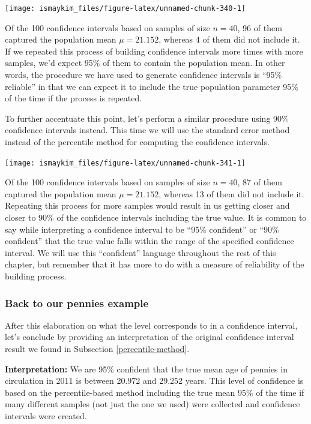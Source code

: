 \documentclass[12pt,]{krantz}
\theoremstyle{definition}
\theoremstyle{definition}
\theoremstyle{definition}
\theoremstyle{remark}
\begin{document}
\begin{center}\texttt{[image: ismaykim\_files/figure-latex/unnamed-chunk-340-1]} \end{center}

Of the 100 confidence intervals based on samples of size \(n = 40\), 96
of them captured the population mean \(\mu = 21.152\), whereas 4 of them
did not include it. If we repeated this process of building confidence
intervals more times with more samples, we'd expect 95\% of them to
contain the population mean. In other words, the procedure we have used
to generate confidence intervals is ``95\% reliable'' in that we can
expect it to include the true population parameter 95\% of the time if
the process is repeated.

To further accentuate this point, let's perform a similar procedure
using 90\% confidence intervals instead. This time we will use the
standard error method instead of the percentile method for computing the
confidence intervals.

\begin{center}\texttt{[image: ismaykim\_files/figure-latex/unnamed-chunk-341-1]} \end{center}

Of the 100 confidence intervals based on samples of size \(n = 40\), 87
of them captured the population mean \(\mu = 21.152\), whereas 13 of
them did not include it. Repeating this process for more samples would
result in us getting closer and closer to 90\% of the confidence
intervals including the true value. It is common to say while
interpreting a confidence interval to be ``95\% confident'' or ``90\%
confident'' that the true value falls within the range of the specified
confidence interval. We will use this ``confident'' language throughout
the rest of this chapter, but remember that it has more to do with a
measure of reliability of the building process.

\subsubsection*{Back to our pennies
example}\label{back-to-our-pennies-example}


After this elaboration on what the level corresponds to in a confidence
interval, let's conclude by providing an interpretation of the original
confidence interval result we found in Subsection
\ref{percentile-method}.

\textbf{Interpretation:} We are 95\% confident that the true mean age of
pennies in circulation in 2011 is between 20.972 and 29.252 years. This
level of confidence is based on the percentile-based method including
the true mean 95\% of the time if many different samples (not just the
one we used) were collected and confidence intervals were created.
\end{document}
